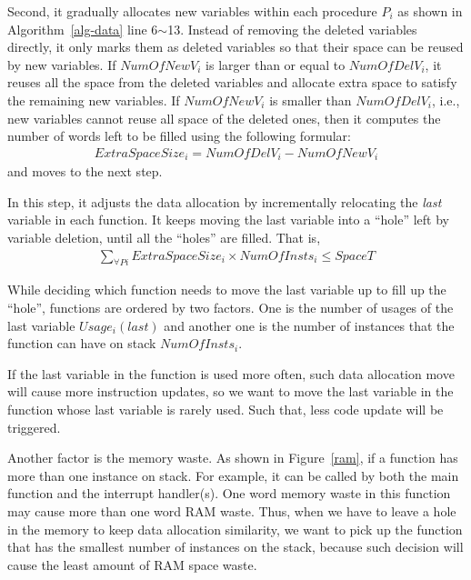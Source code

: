 Second, it gradually allocates new variables within each procedure
$P_i$ as shown in Algorithm~\ref{alg-data} line 6$\sim$13. 
Instead of removing the deleted variables directly, it only marks them as deleted variables so that their space can be reused by new variables. If $NumOfNewV_i$ is larger than or equal to $NumOfDelV_i$, it reuses all the space from the deleted variables and allocate extra space to satisfy the remaining new variables. 
If $NumOfNewV_i$ is smaller than $NumOfDelV_i$, i.e., new variables
cannot reuse all space of the deleted ones, then it computes the number of words left to be filled
using the following formular:
\begin{eqnarray}
ExtraSpaceSize_i = NumOfDelV_i - NumOfNewV_i
\end{eqnarray}
and moves to the next step.

In this step, it adjusts the data allocation by incrementally relocating the
{\em last} variable in each function. It keeps moving the last variable into a
``hole'' left by variable deletion, until all the ``holes'' are filled.
That is,
\begin{eqnarray}
\sum_{\forall Pi} ExtraSpaceSize_i \times NumOfInsts_i \leq SpaceT
\label{spacet}
\end{eqnarray}

While deciding which function needs to move the last variable up to fill up the ``hole'', 
functions are ordered by two factors.
One is the number of usages of the last variable $Usage_i(last)$ and another one is the number of instances 
that the function can have on stack $NumOfInsts_i$.

If the last variable in the function is used more often,
such data allocation move will cause more instruction updates, so we want
to move the last variable in the function whose last variable is
rarely used. Such that, less code update will be triggered.

Another factor is the memory waste. As shown in Figure~\ref{ram}, if a function
has more than one instance on stack. For example, it can be called by both the 
main function and the interrupt handler(s).
One word memory waste in this function may cause 
more than one word RAM waste. Thus, when we have to leave a 
hole in the memory to keep data allocation similarity, we want to
pick up the function that has the smallest number of instances
on the stack, because such decision will cause the least amount of
RAM space waste.

